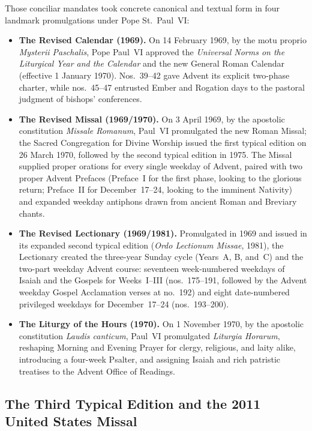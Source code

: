 Those conciliar mandates took concrete canonical and textual form in four landmark promulgations under Pope St.~Paul~VI:

\begin{itemize}
  \item \textbf{The Revised Calendar (1969).} On 14 February 1969, by the motu proprio \textit{Mysterii Paschalis}, Pope Paul~VI approved the \textit{Universal Norms on the Liturgical Year and the Calendar} and the new General Roman Calendar (effective 1 January 1970). Nos.~39--42 gave Advent its explicit two-phase charter, while nos.~45--47 entrusted Ember and Rogation days to the pastoral judgment of bishops' conferences.
  \item \textbf{The Revised Missal (1969/1970).} On 3 April 1969, by the apostolic constitution \textit{Missale Romanum}, Paul~VI promulgated the new Roman Missal; the Sacred Congregation for Divine Worship issued the first typical edition on 26 March 1970, followed by the second typical edition in 1975. The Missal supplied proper orations for every single weekday of Advent, paired with two proper Advent Prefaces (Preface~I for the first phase, looking to the glorious return; Preface~II for December~17--24, looking to the imminent Nativity) and expanded weekday antiphons drawn from ancient Roman and Breviary chants.
  \item \textbf{The Revised Lectionary (1969/1981).} Promulgated in 1969 and issued in its expanded second typical edition (\textit{Ordo Lectionum Missae}, 1981), the Lectionary created the three-year Sunday cycle (Years~A, B, and~C) and the two-part weekday Advent course: seventeen week-numbered weekdays of Isaiah and the Gospels for Weeks~I--III (nos.~175--191, followed by the Advent weekday Gospel Acclamation verses at no.~192) and eight date-numbered privileged weekdays for December~17--24 (nos.~193--200).
  \item \textbf{The Liturgy of the Hours (1970).} On 1 November 1970, by the apostolic constitution \textit{Laudis canticum}, Paul~VI promulgated \textit{Liturgia Horarum}, reshaping Morning and Evening Prayer for clergy, religious, and laity alike, introducing a four-week Psalter, and assigning Isaiah and rich patristic treatises to the Advent Office of Readings.
\end{itemize}

\subsection{The Third Typical Edition and the 2011 United States Missal}

